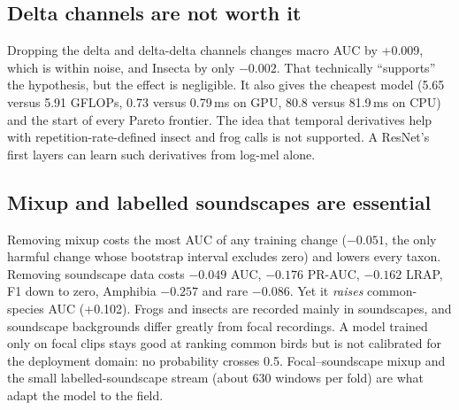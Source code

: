 \documentclass[11pt]{article}
\begin{document}
\subsection{Delta channels are not worth it}
Dropping the delta and delta-delta channels changes macro AUC by +0.009,
which is within noise, and Insecta by only $-0.002$. That technically
``supports'' the hypothesis, but the effect is negligible. It also gives the
cheapest model (5.65 versus 5.91 GFLOPs, 0.73 versus 0.79\,ms on GPU, 80.8
versus 81.9\,ms on CPU) and the start of every Pareto frontier. The idea that
temporal derivatives help with repetition-rate-defined insect and frog calls
is not supported. A ResNet's first layers can learn such derivatives from
log-mel alone.

\subsection{Mixup and labelled soundscapes are essential}
Removing mixup costs the most AUC of any training change ($-0.051$, the only
harmful change whose bootstrap interval excludes zero) and lowers every taxon. Removing soundscape data costs $-0.049$ AUC, $-0.176$ PR-AUC,
$-0.162$ LRAP, F1 down to zero, Amphibia $-0.257$ and rare $-0.086$. Yet it
\emph{raises} common-species AUC (+0.102). Frogs and insects are recorded
mainly in soundscapes, and soundscape backgrounds differ greatly from focal
recordings. A model trained only on focal clips stays good at ranking common
birds but is not calibrated for the deployment domain: no probability crosses
0.5. Focal--soundscape mixup and the small labelled-soundscape stream (about
630 windows per fold) are what adapt the model to the field.
\end{document}
